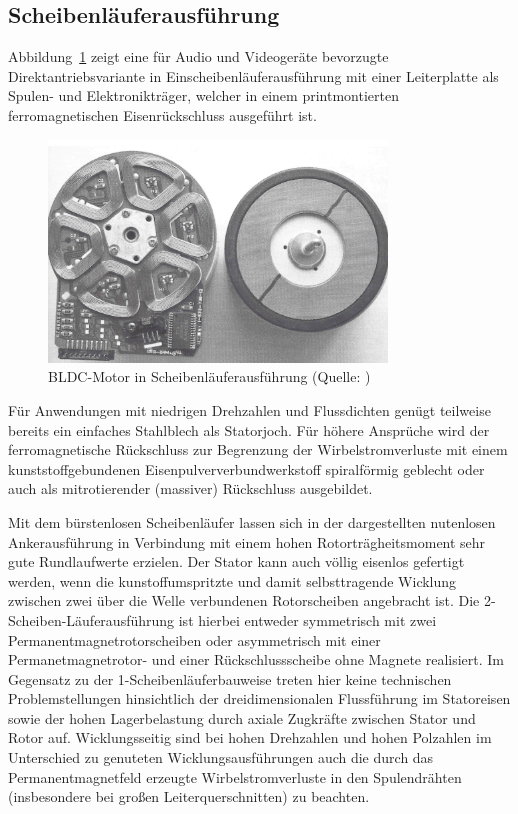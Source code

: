 \subsection{Scheibenläuferausführung}

Abbildung~\ref{fig:3_3} zeigt eine für Audio und Videogeräte bevorzugte Direktantriebsvariante in Einscheibenläuferausführung mit einer Leiterplatte als Spulen- und Elektronikträger, welcher in einem printmontierten ferromagnetischen Eisenrückschluss ausgeführt ist.

\begin{figure}[h]
  \centering
  \includegraphics[width=9cm]{./Grafiken/3_3}
  \caption[BLDC-Motor in Scheibenläuferausführung]{BLDC-Motor in Scheibenläuferausführung (Quelle: \parencite[S.  77]{Stölting2011})}%
  \label{fig:3_3}
\end{figure}

Für Anwendungen mit niedrigen Drehzahlen und Flussdichten genügt teilweise bereits ein einfaches Stahlblech als Statorjoch. Für höhere Ansprüche wird der ferromagnetische Rückschluss zur Begrenzung der Wirbelstromverluste mit einem kunststoffgebundenen Eisenpulververbundwerkstoff spiralförmig geblecht oder auch als mitrotierender (massiver) Rückschluss ausgebildet.

Mit dem bürstenlosen Scheibenläufer lassen sich in der dargestellten nutenlosen Ankerausführung in Verbindung mit einem hohen Rotorträgheitsmoment sehr gute Rundlaufwerte erzielen. Der Stator kann auch völlig eisenlos gefertigt werden, wenn die kunstoffumspritzte und damit selbsttragende Wicklung zwischen zwei über die Welle verbundenen Rotorscheiben angebracht ist. Die 2-Scheiben-Läuferausführung ist hierbei entweder symmetrisch mit zwei Permanentmagnetrotorscheiben oder asymmetrisch mit einer Permanetmagnetrotor- und einer Rückschlussscheibe ohne Magnete realisiert. Im Gegensatz zu der 1-Scheibenläuferbauweise treten hier keine technischen Problemstellungen hinsichtlich der dreidimensionalen Flussführung im Statoreisen sowie der hohen Lagerbelastung durch axiale Zugkräfte zwischen Stator und Rotor auf. Wicklungsseitig sind bei hohen Drehzahlen und hohen Polzahlen im Unterschied zu genuteten Wicklungsausführungen auch die durch das Permanentmagnetfeld erzeugte Wirbelstromverluste in den Spulendrähten (insbesondere bei großen Leiterquerschnitten) zu beachten.

